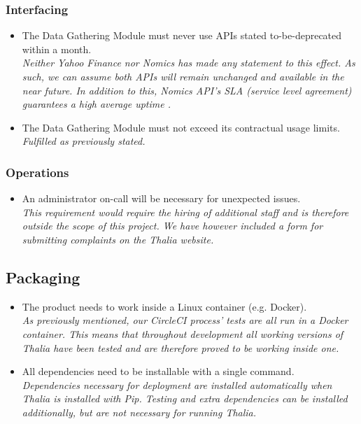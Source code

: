 \documentclass[main.tex]{subfiles}
\begin{document}
\subsubsection{Interfacing}
\begin{itemize}

\item The Data Gathering Module must never use APIs stated to-be-deprecated within a month.\\
\textit{Neither Yahoo Finance nor Nomics has made any statement to this effect. As such, we can assume both APIs will remain unchanged and available in the near future. In addition to this, Nomics API’s SLA (service level agreement) guarantees a high average uptime \cite{nomicsAPISpec}.}
\item The Data Gathering Module must not exceed its contractual usage limits.\\
\textit{Fulfilled as previously stated.}

\end{itemize}

\subsubsection{Operations}
\begin{itemize}

\item An administrator on-call will be necessary for unexpected issues.\\
\textit{This requirement would require the hiring of additional staff and is therefore outside the scope of this project. We have however included a form for submitting complaints on the Thalia website.}

\end{itemize}

\subsection{Packaging}
\begin{itemize}
\item The product needs to work inside a Linux container (e.g. Docker).\\
\textit{As previously mentioned, our CircleCI process’ tests are all run in a Docker container. This means that throughout development all working versions of Thalia have been tested and are therefore proved to be working inside one.}
\item All dependencies need to be installable with a single command.\\
\textit{Dependencies necessary for deployment are installed automatically when Thalia is installed with Pip. Testing and extra dependencies can be installed additionally, but are not necessary for running Thalia.}
\end{itemize}
\end{document}
